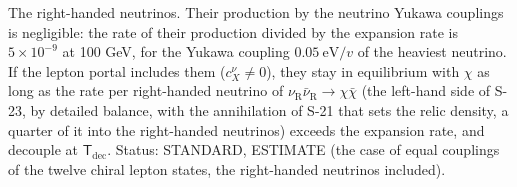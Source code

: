 \documentclass[
  10pt,
]{article}
\begin{document}
The right-handed neutrinos. Their production by the neutrino Yukawa
couplings is negligible: the rate of their production divided by the
expansion rate is \(5\times10^{-9}\) at 100 GeV, for the Yukawa coupling
\(0.05\ \text{eV}/v\) of the heaviest neutrino. If the lepton portal
includes them (\(c^{\nu}_X \ne 0\)), they stay in equilibrium with
\(\chi\) as long as the rate per right-handed neutrino of
\(\nu_{\mathrm{R}}\bar\nu_{\mathrm{R}} \to \chi\bar\chi\) (the left-hand
side of S-23, by detailed balance, with the annihilation of S-21 that
sets the relic density, a quarter of it into the right-handed neutrinos)
exceeds the expansion rate, and decouple at
\(\mathsf{T}_{\mathrm{dec}}\). Status: STANDARD, ESTIMATE (the case of
equal couplings of the twelve chiral lepton states, the right-handed
neutrinos included).
\end{document}
